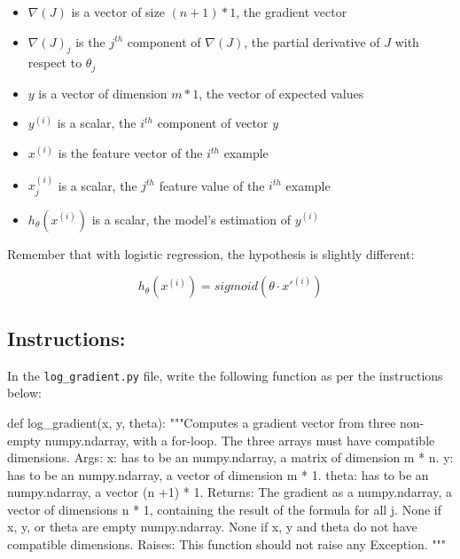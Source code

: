 \documentclass[]{article}
\newenvironment{Shaded}{\begin{snugshade}}{\end{snugshade}}
\newcommand{\CommentTok}[1]{\textcolor[rgb]{0.48,0.49,0.49}{#1}}
\newcommand{\KeywordTok}[1]{\textcolor[rgb]{0.81,0.81,0.76}{#1}}
\newcommand{\NormalTok}[1]{\textcolor[rgb]{0.81,0.81,0.76}{#1}}
\begin{document}
\begin{itemize}
\item
  \(\nabla(J)\) is a vector of size \((n + 1) * 1\), the gradient vector
\item
  \(\nabla(J)_j\) is the \(j^{th}\) component of \(\nabla(J)\), the
  partial derivative of \(J\) with respect to \(\theta_j\)
\item
  \(y\) is a vector of dimension \(m * 1\), the vector of expected
  values
\item
  \(y^{(i)}\) is a scalar, the \(i^{th}\) component of vector \(y\)
\item
  \(x^{(i)}\) is the feature vector of the \(i^{th}\) example
\item
  \(x^{(i)}_j\) is a scalar, the \(j^{th}\) feature value of the
  \(i^{th}\) example
\item
  \(h_{\theta}(x^{(i)})\) is a scalar, the model's estimation of
  \(y^{(i)}\)
\end{itemize}

Remember that with logistic regression, the hypothesis is slightly
different:

\large

\[
h_{\theta}(x^{(i)}) = sigmoid( \theta \cdot x'^{(i)})
\] \normalsize

\hypertarget{instructions-6}{%
\subsection{Instructions:}\label{instructions-6}}

In the \texttt{log\_gradient.py} file, write the following function as
per the instructions below:

\begin{Shaded}
\begin{Highlighting}[]
\KeywordTok{def}\NormalTok{ log_gradient(x, y, theta):}
    \CommentTok{"""Computes a gradient vector from three non-empty numpy.ndarray, with a for-loop. The three arrays must have compatible dimensions.}
\CommentTok{    Args:}
\CommentTok{      x: has to be an numpy.ndarray, a matrix of dimension m * n.}
\CommentTok{      y: has to be an numpy.ndarray, a vector of dimension m * 1.}
\CommentTok{      theta: has to be an numpy.ndarray, a vector (n +1) * 1.}
\CommentTok{    Returns:}
\CommentTok{      The gradient as a numpy.ndarray, a vector of dimensions n * 1, containing the result of the formula for all j.}
\CommentTok{      None if x, y, or theta are empty numpy.ndarray.}
\CommentTok{      None if x, y and theta do not have compatible dimensions.}
\CommentTok{    Raises:}
\CommentTok{      This function should not raise any Exception.}
\CommentTok{    """}
\end{Highlighting}
\end{Shaded}
\end{document}
